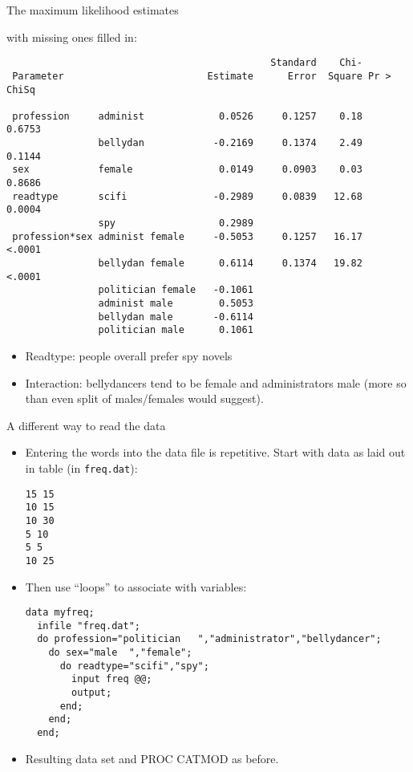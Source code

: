 \documentclass[pdf]{prosper}
\begin{document}
\begin{slide}{The maximum likelihood estimates}

with missing ones filled in:

{\scriptsize
\begin{verbatim}
                                              Standard    Chi-
 Parameter                         Estimate      Error  Square Pr > ChiSq

 profession     administ             0.0526     0.1257    0.18     0.6753
                bellydan            -0.2169     0.1374    2.49     0.1144
 sex            female               0.0149     0.0903    0.03     0.8686
 readtype       scifi               -0.2989     0.0839   12.68     0.0004
                spy                  0.2989
 profession*sex administ female     -0.5053     0.1257   16.17     <.0001
                bellydan female      0.6114     0.1374   19.82     <.0001
                politician female   -0.1061
                administ male        0.5053
                bellydan male       -0.6114
                politician male      0.1061

\end{verbatim}
}

\begin{itemize}
\item Readtype: people overall prefer spy novels
\item Interaction: bellydancers tend to be female and administrators male (more so than even split of males/females would suggest).
\end{itemize}
  
\end{slide}

\begin{slide}{A different way to read the data}

  \begin{itemize}
  \item Entering the words into the data file is repetitive. Start with data as laid out in table (in \verb-freq.dat-):

{\scriptsize
\begin{verbatim}
15 15
10 15
10 30
5 10
5 5
10 25
\end{verbatim}
}


\item Then use ``loops'' to associate with variables:

{\scriptsize
\begin{verbatim}
data myfreq;
  infile "freq.dat";
  do profession="politician   ","administrator","bellydancer";
    do sex="male  ","female";
      do readtype="scifi","spy";
        input freq @@;
        output;
      end;
    end;
  end;

\end{verbatim}
}

\item Resulting data set and PROC CATMOD as before.
    
  \end{itemize}
  
\end{slide}
\end{document}
